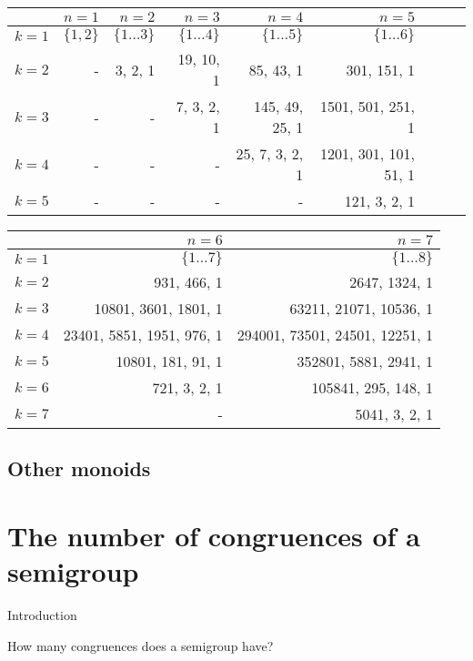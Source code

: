 \begin{table}[h]
  \centering
  \begin{tabular}{|r|r|r|r|r|r|r|r|r|}
    \hline
    & $n=1$ & $n=2$ & $n=3$ & $n=4$ & $n=5$ \\ \hline
    $k=1$ & $\{1, 2\}$ & $\{1\dots 3\}$ & $\{1\dots 4\}$ & $\{1\dots 5\}$ & $\{1\dots 6\}$ \\
    $k=2$ & - & 3, 2, 1 & 19, 10, 1 & 85, 43, 1 & 301, 151, 1 \\
    $k=3$ & - & - & 7, 3, 2, 1 & 145, 49, 25, 1 & 1501, 501, 251, 1 \\
    $k=4$ & - & - & - & 25, 7, 3, 2, 1 & 1201, 301, 101, 51, 1 \\
    $k=5$ & - & - & - & - & 121, 3, 2, 1 \\
    \hline
  \end{tabular}
\end{table}

\begin{table}[h]
  \centering
  \begin{tabular}{|r|r|r|}
    \hline
    & $n=6$ & $n=7$ \\ \hline
    $k=1$ & $\{1\dots 7\}$ & $\{1\dots 8\}$ \\
    $k=2$ & 931, 466, 1 & 2647, 1324, 1 \\
    $k=3$ & 10801, 3601, 1801, 1 & 63211, 21071, 10536, 1 \\
    $k=4$ & 23401, 5851, 1951, 976, 1 & 294001, 73501, 24501, 12251, 1 \\
    $k=5$ & 10801, 181, 91, 1 & 352801, 5881, 2941, 1 \\
    $k=6$ & 721, 3, 2, 1 & 105841, 295, 148, 1 \\
    $k=7$ & - & 5041, 3, 2, 1 \\
    \hline
  \end{tabular}
\end{table}

\subsection{Other monoids}



\section{The number of congruences of a semigroup}
\label{sec:nrcongs}

Introduction

How many congruences does a semigroup have? %

